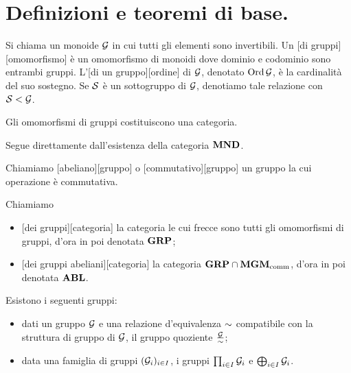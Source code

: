 \section{Definizioni e teoremi di base.}\label{DefinizioniETeoremiDiBase}
\begin{Definition}
	Si chiama  un monoide $\mathcal{G}$ in cui tutti gli elementi sono invertibili. Un [di gruppi][omomorfismo] \`e un omomorfismo di monoidi dove dominio e codominio sono entrambi gruppi. L'[di un gruppo][ordine] di $\mathcal{G}$, denotato $\operatorname{\operatorname{Ord}}{\mathcal{G}}$, \`e la cardinalit\`a del suo sostegno. Se $\mathcal{S}$ \`e un sottogruppo di $\mathcal{G}$, denotiamo tale relazione con $\mathcal{S} < \mathcal{G}$.
\end{Definition}
\begin{Theorem}
	Gli omomorfismi di gruppi costituiscono una categoria.
\end{Theorem}
\Proof Segue direttamente dall'esistenza della categoria $\mathbf{MND}$. \EndProof
\begin{Definition}
	Chiamiamo [abeliano][gruppo] o [commutativo][gruppo] un gruppo la cui operazione \`e commutativa.
\end{Definition}
\begin{Definition}
	Chiamiamo
	\begin{itemize}
		\item {}[dei gruppi][categoria] la categoria le cui frecce sono tutti gli omomorfismi di gruppi, d'ora in poi denotata $\mathbf{GRP}$;
		\item {}[dei gruppi abeliani][categoria] la categoria $\mathbf{GRP} \cap \mathbf{MGM}_{\text{comm}}$, d'ora in poi denotata $\mathbf{ABL}$.
	\end{itemize}
\end{Definition}
\begin{Theorem}
	Esistono i seguenti gruppi:
	\begin{itemize}
		\item dati un gruppo $\mathcal{G}$ e una relazione d'equivalenza $\Equivalence$ compatibile con la struttura di gruppo di $\mathcal{G}$, il gruppo quoziente $\Quotient{\Group}{\Equivalence}$;
		\item data una famiglia di gruppi $(\mathcal{G}_i)_{i \in I}$, i gruppi $\prod_{i \in I} \mathcal{G}_i$ e $\bigoplus_{i \in I} \mathcal{G}_i$.
	\end{itemize}
\end{Theorem}
